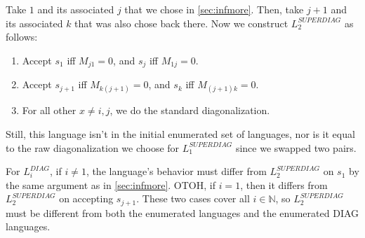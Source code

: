 \documentclass[12pt]{article}
\newcommand{\N}{\mathbb{N}}
\begin{document}
Take $1$ and its associated $j$ that we chose in \ref{sec:infmore}.
Then, take $j+1$ and its associated $k$ that was also chose back there.
Now we construct $L_2^{SUPERDIAG}$ as follows:
\begin{enumerate}[nolistsep]
    \item Accept $s_1$ iff $M_{j1}=0$, and $s_j$ iff $M_{1j}=0$.
    \item Accept $s_{j+1}$ iff $M_{k(j+1)}=0$, and $s_k$ iff $M_{(j+1)k}=0$.
    \item For all other $x \ne i, j$, we do the standard diagonalization.
\end{enumerate}
Still, this language isn't in the initial enumerated set of languages,
nor is it equal to the raw diagonalization we choose for $L_1^{SUPERDIAG}$
since we swapped two pairs.

For $L_i^{DIAG}$, if $i \ne 1$, the language's behavior must differ
from $L_2^{SUPERDIAG}$ on $s_1$ by the same argument as in \ref{sec:infmore}.
OTOH, if $i=1$, then it differs from $L_2^{SUPERDIAG}$ on accepting $s_{j+1}$.
These two cases cover all $i \in \N$, so $L_2^{SUPERDIAG}$
must be different from both the enumerated languages and the
enumerated DIAG languages.
\end{document}

